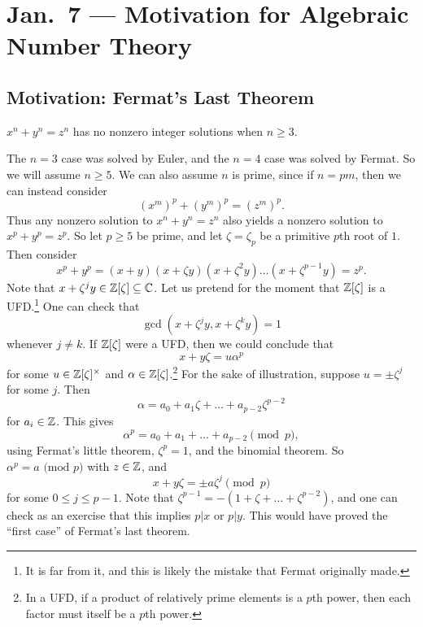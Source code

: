 \chapter{Jan.~7 --- Motivation for Algebraic Number Theory}

\section{Motivation: Fermat's Last Theorem}

\begin{theorem}
  $x^n + y^n = z^n$
  has no nonzero integer solutions when $n \ge 3$.
\end{theorem}

\begin{remark}
  The $n = 3$ case was solved by Euler, and the $n = 4$
  case was solved by Fermat. So we will
  assume
  $n \ge 5$. We can also assume $n$ is prime, since
  if $n = pm$, then we can instead consider
  \[
    (x^m)^p + (y^m)^p = (z^m)^p.
  \]
  Thus any nonzero solution to $x^n + y^n = z^n$
  also yields a nonzero solution to $x^p + y^p = z^p$.
  So let $p \ge 5$ be prime, and let
  $\zeta = \zeta_p$ be a primitive $p$th root of $1$.
  Then consider
  \[
    x^p + y^p = (x + y) (x + \zeta y) (x + \zeta^2 y) \dots (x + \zeta^{p-1} y) = z^p.
  \]
  Note that $x + \zeta^j y \in \mathbb{Z}[\zeta] \subseteq \mathbb{C}$.
  Let us pretend for the moment that $\mathbb{Z}[\zeta]$ is
  a UFD.\footnote{It is far from it, and this is likely the mistake that Fermat originally made.}
  One can check that
  \[
    \gcd(x + \zeta^j y, x + \zeta^k y) = 1
  \]
  whenever $j \ne k$. If $\mathbb{Z}[\zeta]$ were a UFD, then
  we could conclude that
  \[
    x + y \zeta = u \alpha^p
  \]
  for some $u \in \mathbb{Z}[\zeta]^\times$ and
  $\alpha \in \mathbb{Z}[\zeta]$.\footnote{In a UFD, if a product of relatively prime elements is a $p$th power, then each factor must itself be a $p$th power.}
  For the sake of illustration, suppose $u = \pm \zeta^j$
  for some $j$.
  Then
  \[
    \alpha = a_0 + a_1 \zeta + \dots + a_{p - 2} \zeta^{p - 2}
  \]
  for $a_i \in \mathbb{Z}$. This gives
  \[
    \alpha^p = a_0 + a_1 + \dots + a_{p - 2} \pmod{p},
  \]
  using Fermat's little theorem, $\zeta^p = 1$,
  and the binomial theorem. So
  $\alpha^p = a \text{ (mod $p$)}$ with $z \in \mathbb{Z}$,
  and
  \[
    x + y \zeta = \pm a \zeta^j \pmod{p}
  \]
  for some $0 \le j \le p - 1$. Note that
  $\zeta^{p - 1} = -(1 + \zeta + \dots + \zeta^{p - 2})$,
  and one can check as an exercise that this implies
  $p | x$ or $p | y$. This would have proved the
  ``first case'' of Fermat's last theorem.
\end{remark}

